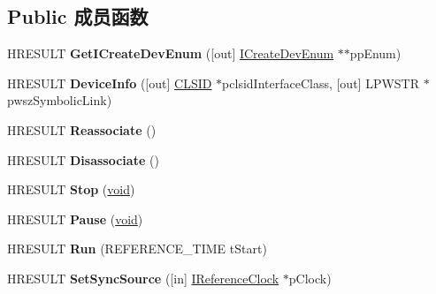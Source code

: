 \subsection*{Public 成员函数}
\begin{DoxyCompactItemize}
\item 
\mbox{\label{interfaceenum_ae1d61ce6b9eaa5470611a5b48583e745}} 
H\+R\+E\+S\+U\+LT {\bfseries Get\+I\+Create\+Dev\+Enum} (\mbox{[}out\mbox{]} \hyperlink{interface_i_create_dev_enum}{I\+Create\+Dev\+Enum} $\ast$$\ast$pp\+Enum)
\item 
\mbox{\label{interfaceenum_a232628a529322804e9f1b14b34de91fa}} 
H\+R\+E\+S\+U\+LT {\bfseries Device\+Info} (\mbox{[}out\mbox{]} \hyperlink{struct___i_i_d}{C\+L\+S\+ID} $\ast$pclsid\+Interface\+Class, \mbox{[}out\mbox{]} L\+P\+W\+S\+TR $\ast$pwsz\+Symbolic\+Link)
\item 
\mbox{\label{interfaceenum_aa62462b9637a436152e6daadf1dd68ed}} 
H\+R\+E\+S\+U\+LT {\bfseries Reassociate} ()
\item 
\mbox{\label{interfaceenum_a710ca2ba9c5c2e43449bab45621d4f30}} 
H\+R\+E\+S\+U\+LT {\bfseries Disassociate} ()
\item 
\mbox{\label{interfaceenum_a7f07bf7cb8b320b6399749591c820282}} 
H\+R\+E\+S\+U\+LT {\bfseries Stop} (\hyperlink{interfacevoid}{void})
\item 
\mbox{\label{interfaceenum_a4a30f8416a65ccc36b85613074a9fad4}} 
H\+R\+E\+S\+U\+LT {\bfseries Pause} (\hyperlink{interfacevoid}{void})
\item 
\mbox{\label{interfaceenum_a121afb6b9113bf62dab985cf762ff75e}} 
H\+R\+E\+S\+U\+LT {\bfseries Run} (R\+E\+F\+E\+R\+E\+N\+C\+E\+\_\+\+T\+I\+ME t\+Start)
\item 
\mbox{\label{interfaceenum_ab64d3b727c5ec313e6049b0791c977cd}} 
H\+R\+E\+S\+U\+LT {\bfseries Set\+Sync\+Source} (\mbox{[}in\mbox{]} \hyperlink{interface_i_reference_clock}{I\+Reference\+Clock} $\ast$p\+Clock)
\item 
\mbox{\label{interfaceenum_a56e9463cf3641c71bd62d8b9cde1f45c}} 
$$
\end{DoxyCompactItemize}
